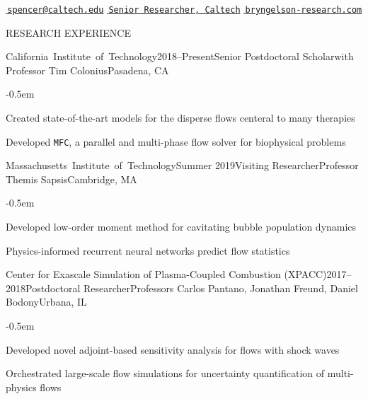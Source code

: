 \documentclass{resume} %
\newcommand{\sepss}{-0.5em}
\newcommand{\negspace}{-0.8em}
\newcommand\Caltech{\mbox{California Institute of Technology}}
\newcommand\MIT{\mbox{Massachusetts Institute of Technology}}
\begin{document}
\begin{center}
	\vspace*{-1cm}
    \href{mailto:spencer@caltech.edu}{\faEnvelope\,\texttt{spencer{@}caltech.edu}} \quad
    \href{https://bryngelson-research.com/cv_bryngelson.pdf}{\faInstitution\,\texttt{Senior Researcher, Caltech}} \quad
	\href{https://bryngelson-research.com}{\faHome\,\texttt{bryngelson-research.com}}
\end{center}

\begin{rSection}{{\Large R}ESEARCH EXPERIENCE}

\begin{myrSubsections}{\Caltech}{2018--Present}{Senior Postdoctoral Scholar}{with Professor Tim Colonius}{Pasadena, CA} 
	\begin{list}{\textbullet}{\leftmargin=2.5em} 
	  	\itemsep \sepss 
	  	\vspace{\negspace} 
		\item Created state-of-the-art models for the disperse flows centeral to many therapies
        \item Developed \texttt{MFC}, a parallel and multi-phase flow solver for biophysical problems
  	\end{list}
\end{myrSubsections}

\begin{myrSubsections}{\MIT}{Summer 2019}{Visiting Researcher}{Professor Themis Sapsis}{Cambridge, MA} 
	\begin{list}{\textbullet}{\leftmargin=2.5em} 
	  	\itemsep \sepss 
	  	\vspace{\negspace} 
		\item Developed low-order moment method for cavitating bubble population dynamics
        \item Physics-informed recurrent neural networks predict flow statistics
  	\end{list}
\end{myrSubsections}

\begin{myrSubsections}{Center for Exascale Simulation of Plasma-Coupled Combustion (XPACC)}{2017--2018}{Postdoctoral Researcher}{Professors Carlos Pantano, Jonathan Freund, Daniel Bodony}{Urbana, IL}
	\begin{list}{\textbullet}{\leftmargin=2.5em} 
	  	\itemsep \sepss 
	  	\vspace{\negspace} 
     	\item Developed novel adjoint-based sensitivity analysis for flows with shock waves
		\item Orchestrated large-scale flow simulations for uncertainty quantification of multi-physics flows
  	\end{list}
\end{myrSubsections}


\end{rSection}
\end{document}
